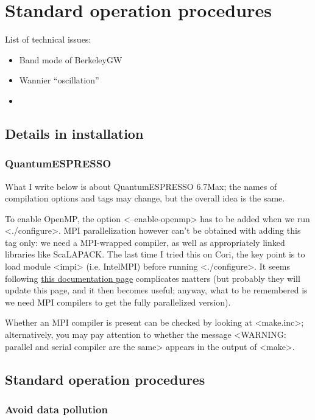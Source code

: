 \documentclass[hyperref, a4paper]{report}
\def\texttt#1{<#1>}%
\newcommand{\shortcode}[1]{\texttt{#1}}
\begin{document}
\chapter{Standard operation procedures}

List of technical issues:
\begin{itemize}
    \item Band mode of BerkeleyGW
    \item Wannier ``oscillation''
    \item 
\end{itemize}

\section{Details in installation}

\subsection{QuantumESPRESSO}\label{sec:qe-install}

What I write below is about QuantumESPRESSO 6.7Max; 
the names of compilation options and tags may change, 
but the overall idea is the same. 

To enable OpenMP, 
the option \shortcode{--enable-openmp} has to be added 
when we run \shortcode{./configure}.
MPI parallelization however can't be obtained with adding this tag only: 
we need a MPI-wrapped compiler,
as well as appropriately linked libraries like ScaLAPACK. 
The last time I tried this on Cori, 
the key point is to load module \shortcode{impi} 
(i.e. IntelMPI) before running \shortcode{./configure}.
It seems following \href{https://docs.nersc.gov/applications/quantum-espresso/}{this documentation page}
complicates matters 
(but probably they will update this page, and it then becomes useful;
anyway, what to be remembered is we need MPI compilers 
to get the fully parallelized version).

Whether an MPI compiler is present can be checked by looking at \shortcode{make.inc}; 
alternatively, you may pay attention to whether the message 
\shortcode{WARNING: parallel and serial compiler are the same}
appears in the output of \shortcode{make}.

\section{Standard operation procedures}

\subsection{Avoid data pollution}
\end{document}
